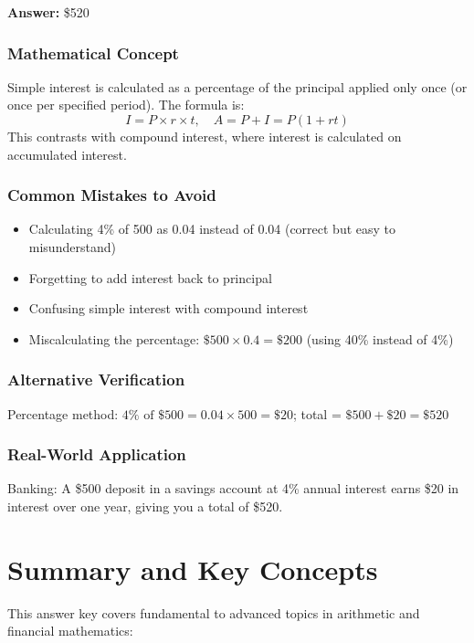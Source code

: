 \documentclass[12pt]{article}
\begin{document}
\textbf{Answer: } \$520

\subsubsection*{Mathematical Concept}
Simple interest is calculated as a percentage of the principal applied only once (or once per specified period). The formula is:
\[
I = P \times r \times t, \quad A = P + I = P(1 + rt)
\]
This contrasts with compound interest, where interest is calculated on accumulated interest.

\subsubsection*{Common Mistakes to Avoid}
\begin{itemize}
\item Calculating 4\% of 500 as 0.04 instead of 0.04 (correct but easy to misunderstand)
\item Forgetting to add interest back to principal
\item Confusing simple interest with compound interest
\item Miscalculating the percentage: $\$500 \times 0.4 = \$200$ (using 40\% instead of 4\%)
\end{itemize}

\subsubsection*{Alternative Verification}
Percentage method: $4\% \text{ of } \$500 = 0.04 \times 500 = \$20$; total = $\$500 + \$20 = \$520$ 

\subsubsection*{Real-World Application}
Banking: A \$500 deposit in a savings account at 4\% annual interest earns \$20 in interest over one year, giving you a total of \$520.

\newpage

\appendix

\section*{Summary and Key Concepts}

This answer key covers fundamental to advanced topics in arithmetic and financial mathematics:
\end{document}

